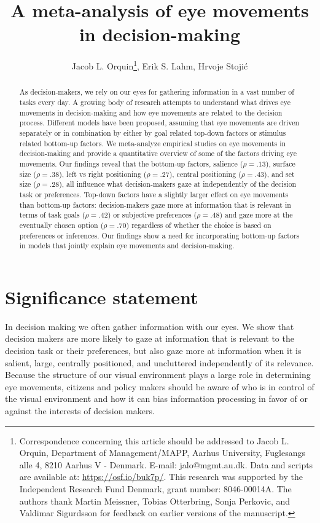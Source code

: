 \documentclass{article}
\title{A meta-analysis of eye movements in decision-making}
\author{
  Jacob L. Orquin\thanks{Correspondence concerning this article should be addressed to Jacob L. Orquin, Department of Management/MAPP, Aarhus University, Fuglesangs alle 4, 8210 Aarhus V - Denmark. E-mail: jalo@mgmt.au.dk. Data and scripts are available at: \url{https://osf.io/buk7p/}. This research was supported by the Independent Research Fund Denmark, grant number: 8046-00014A. The authors thank Martin Meissner, Tobias Otterbring, Sonja Perkovic, and Valdimar Sigurdsson for feedback on earlier versions of the manuscript.}, Erik S. Lahm, Hrvoje Stojić
}
\begin{document}
\maketitle



\begin{abstract}  %
As decision-makers, we rely on our eyes for gathering information in a vast number of tasks every day. A growing body of research attempts to understand what drives eye movements in decision-making and how eye movements are related to the decision process. Different models have been proposed, assuming that eye movements are driven separately or in combination by either by goal related top-down factors or stimulus related bottom-up factors. We meta-analyze empirical studies on eye movements in decision-making and provide a quantitative overview of some of the factors driving eye movements. Our findings reveal that the bottom-up factors, salience ($\rho = .13$), surface size ($\rho = .38$), left vs right positioning ($\rho = .27$), central positioning ($\rho = .43$), and set size ($\rho = .28$), all influence what decision-makers gaze at independently of the decision task or preferences. Top-down factors have a slightly larger effect on eye movements than bottom-up factors: decision-makers gaze more at information that is relevant in terms of task goals ($\rho = .42$) or subjective preferences ($\rho = .48$) and gaze more at the eventually chosen option ($\rho = .70$) regardless of whether the choice is based on preferences or inferences. Our findings show a need for incorporating bottom-up factors in models that jointly explain eye movements and decision-making.
\end{abstract}




\section{Significance statement}

In decision making we often gather information with our eyes. We show that decision makers are more likely to gaze at information that is relevant to the decision task or their preferences, but also gaze more at information when it is salient, large, centrally positioned, and uncluttered independently of its relevance. Because the structure of our visual environment plays a large role in determining eye movements, citizens and policy makers should be aware of who is in control of the visual environment and how it can bias information processing in favor of or against the interests of decision makers.   
\end{document}
